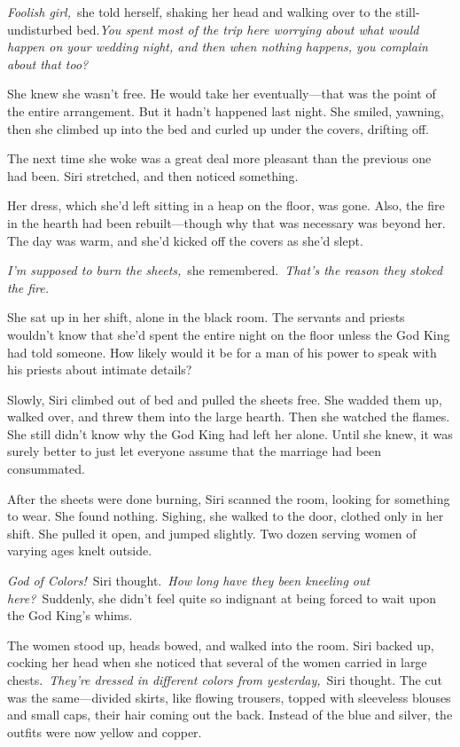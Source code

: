 \textit{Foolish girl,}~she told herself, shaking her head and walking over to the still-undisturbed bed.\textit{You spent most of the trip here worrying about what would happen on your wedding night, and then when nothing happens, you complain about that too?}

She knew she wasn’t free. He would take her eventually—that was the point of the entire arrangement. But it hadn’t happened last night. She smiled, yawning, then she climbed up into the bed and curled up under the covers, drifting off.

\orn

The next time she woke was a great deal more pleasant than the previous one had been. Siri stretched, and then noticed something.

Her dress, which she’d left sitting in a heap on the floor, was gone. Also, the fire in the hearth had been rebuilt—though why that was necessary was beyond her. The day was warm, and she’d kicked off the covers as she’d slept.

\textit{I’m supposed to burn the sheets,}~she remembered.~\textit{That’s the reason they stoked the fire.}

She sat up in her shift, alone in the black room. The servants and priests wouldn’t know that she’d spent the entire night on the floor unless the God King had told someone. How likely would it be for a man of his power to speak with his priests about intimate details?

Slowly, Siri climbed out of bed and pulled the sheets free. She wadded them up, walked over, and threw them into the large hearth. Then she watched the flames. She still didn’t know why the God King had left her alone. Until she knew, it was surely better to just let everyone assume that the marriage had been consummated.

After the sheets were done burning, Siri scanned the room, looking for something to wear. She found nothing. Sighing, she walked to the door, clothed only in her shift. She pulled it open, and jumped slightly. Two dozen serving women of varying ages knelt outside.

\textit{God of Colors!}~Siri thought.~\textit{How long have they been kneeling out here?}~Suddenly, she didn’t feel quite so indignant at being forced to wait upon the God King’s whims.

The women stood up, heads bowed, and walked into the room. Siri backed up, cocking her head when she noticed that several of the women carried in large chests.~\textit{They’re dressed in different colors from yesterday,}~Siri thought. The cut was the same—divided skirts, like flowing trousers, topped with sleeveless blouses and small caps, their hair coming out the back. Instead of the blue and silver, the outfits were now yellow and copper.

